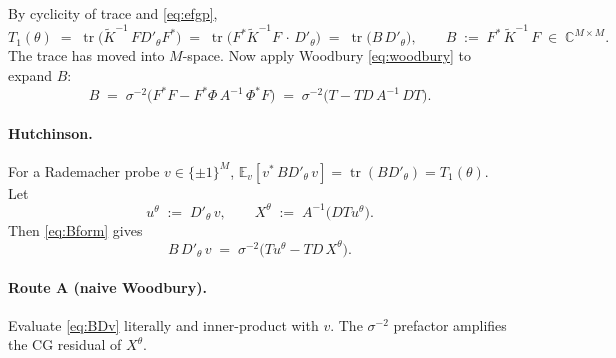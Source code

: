 \documentclass[11pt]{article}
\numberwithin{equation}{section}
\newcommand{\tr}{\operatorname{tr}}
\newcommand{\Ktil}{\widetilde K}
\newcommand{\Amean}{A}
\begin{document}
By cyclicity of trace and \eqref{eq:efgp},
\begin{equation}
  T_1(\theta) \;=\; \tr\!\bigl(\Ktil^{-1}\,F D'_\theta F^*\bigr)
              \;=\; \tr\!\bigl(F^*\Ktil^{-1}F\,\cdot\,D'_\theta\bigr)
              \;=\; \tr\!\bigl(B\,D'_\theta\bigr),\qquad
  B \;:=\; F^*\,\Ktil^{-1}\,F \;\in\;\mathbb{C}^{M\times M}.
  \label{eq:Bdef}
\end{equation}
The trace has moved into $M$-space. Now apply Woodbury \eqref{eq:woodbury} to
expand $B$:
\begin{equation}
  B \;=\; \sigma^{-2}\bigl(F^*F - F^*\Phi\,\Amean^{-1}\,\Phi^*F\bigr)
     \;=\; \sigma^{-2}\bigl(T - T D\,\Amean^{-1}\,D T\bigr).
  \label{eq:Bform}
\end{equation}

\paragraph{Hutchinson.} For a Rademacher probe $v\in\{\pm1\}^M$,
$\mathbb{E}_v[v^*\,BD'_\theta\,v] = \tr(BD'_\theta) = T_1(\theta)$. Let
\[
  u^\theta \;:=\; D'_\theta\,v,\qquad
  X^\theta \;:=\; \Amean^{-1}\bigl(D T u^\theta\bigr).
\]
Then \eqref{eq:Bform} gives
\begin{equation}
  B\,D'_\theta\,v \;=\; \sigma^{-2}\bigl(T u^\theta - T D\,X^\theta\bigr).
  \label{eq:BDv}
\end{equation}

\paragraph{Route A (naive Woodbury).} Evaluate \eqref{eq:BDv} literally and
inner-product with $v$. The $\sigma^{-2}$ prefactor amplifies the CG residual of
$X^\theta$.
\end{document}
